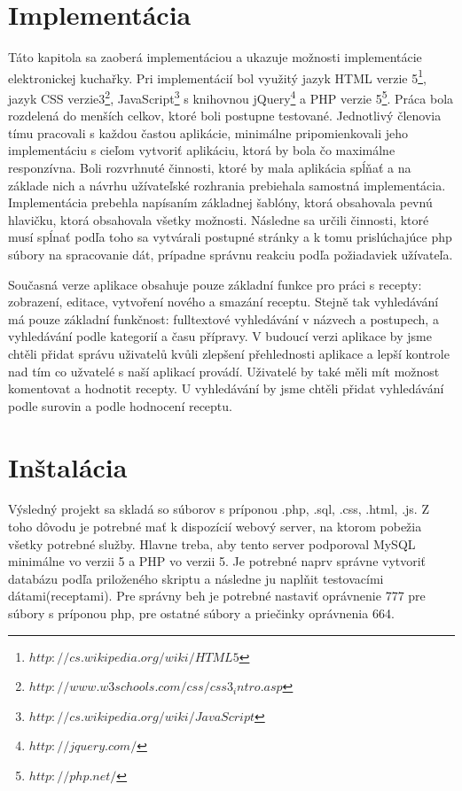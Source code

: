 \documentclass[12pt,a4paper,titlepage,final]{article}
\begin{document}
\section{Implementácia}
Táto kapitola sa zaoberá implementáciou a ukazuje možnosti implementácie elektronickej kuchařky. Pri implementácií bol využitý jazyk HTML verzie 5\footnote{$http://cs.wikipedia.org/wiki/HTML5$}, jazyk CSS verzie3\footnote{$http://www.w3schools.com/css/css3_intro.asp$}, JavaScript\footnote{$http://cs.wikipedia.org/wiki/JavaScript$} s knihovnou jQuery\footnote{$http://jquery.com/$} a PHP verzie 5\footnote{$http://php.net/$}. Práca bola rozdelená do menších celkov, ktoré boli postupne testované. Jednotlivý členovia tímu pracovali s každou častou aplikácie, minimálne pripomienkovali jeho implementáciu s cieľom vytvoriť aplikáciu, ktorá by bola čo maximálne responzívna. Boli rozvrhnuté činnosti, ktoré by mala aplikácia spĺňať a na základe nich a návrhu užívateľské rozhrania prebiehala samostná implementácia. Implementácia prebehla napísaním základnej šablóny, ktorá obsahovala pevnú hlavičku, ktorá obsahovala všetky možnosti. Následne sa určili činnosti, ktoré musí spĺnať podľa toho sa vytvárali postupné stránky a k tomu prislúchajúce php súbory na spracovanie dát, prípadne správnu reakciu podľa požiadaviek užívateľa.\cite{Prokop:Algoritmy}

Současná verze aplikace obsahuje pouze základní funkce pro práci s recepty: zobrazení, editace, vytvoření nového a smazání receptu. Stejně tak vyhledávání má pouze základní funkčnost: fulltextové vyhledávání v názvech a postupech, a vyhledávání podle kategorií a času přípravy. V budoucí verzi aplikace by jsme chtěli přidat správu uživatelů kvůli zlepšení přehlednosti aplikace a lepší kontrole nad tím co užvatelé s naší aplikací provádí. Uživatelé by také měli mít možnost komentovat a hodnotit recepty. U vyhledávání by jsme chtěli přidat vyhledávání podle surovin a podle hodnocení receptu. 

\section{Inštalácia}
Výsledný projekt sa skladá so súborov s príponou .php, .sql, .css, .html, .js. Z toho dôvodu je potrebné mať k dispozícií webový server, na ktorom pobežia všetky potrebné služby. Hlavne treba, aby tento server podporoval MySQL minimálne vo verzii 5 a PHP vo verzii 5. Je potrebné naprv správne vytvoriť databázu podľa priloženého skriptu a následne ju naplňit testovacími dátami(receptami). Pre správny beh je potrebné nastaviť oprávnenie 777 pre súbory s príponou php, pre ostatné súbory a priečinky oprávnenia 664.
\end{document}
